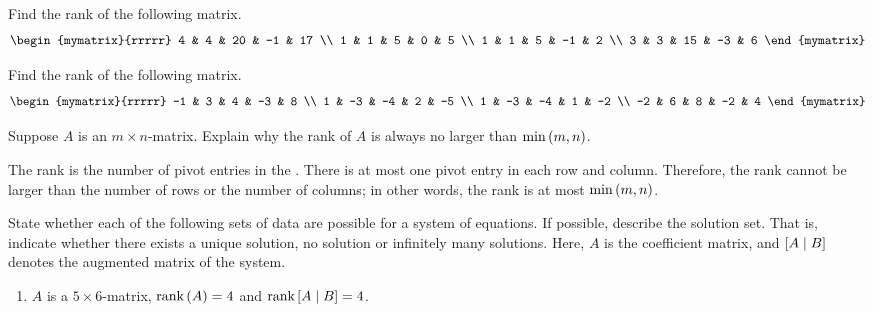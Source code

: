 \begin{enumialphparenastyle}
\begin{ex} Find the rank of the following matrix.
\begin{equation*}
\begin{mymatrix}{rrrrr}
4 & 4 & 20 & -1 & 17 \\
1 & 1 & 5 & 0 & 5 \\
1 & 1 & 5 & -1 & 2 \\
3 & 3 & 15 & -3 & 6
\end{mymatrix}
\end{equation*}
\end{ex}

\begin{ex} Find the rank of the following matrix.
\begin{equation*}
\begin{mymatrix}{rrrrr}
-1 & 3 & 4 & -3 & 8 \\
1 & -3 & -4 & 2 & -5 \\
1 & -3 & -4 & 1 & -2 \\
-2 & 6 & 8 & -2 & 4
\end{mymatrix}
\end{equation*}
\end{ex}

\begin{ex}
  Suppose $A$ is an $m\times n$-matrix. Explain why the rank of $A$ is
  always no larger than $\min \left(m,n\right)$.
  \begin{sol}
    The rank is the number of pivot entries in the {\ef}. There is at
    most one pivot entry in each row and column. Therefore, the rank
    cannot be larger than the number of rows or the number of columns;
    in other words, the rank is at most $\min\left(m,n\right)$.
  \end{sol}
\end{ex}

\begin{ex}
  State whether each of the following sets of data are
  possible for a system of equations. If possible, describe the
  solution set.  That is, indicate whether there exists a unique
  solution, no solution or infinitely many solutions. Here, $A$ is
  the coefficient matrix, and $\left[A\mid B\right]$ denotes the
  augmented matrix of the system.
  
  \begin{enumerate}
  \item $A$ is a $5\times 6$-matrix, $\mbox{\rm rank}\left(A\right) =4$ and 
    $\mbox{\rm rank}\left[A\mid B\right] =4$. 
    

\end{enumerate}
\end{ex}
\end{enumialphparenastyle}
